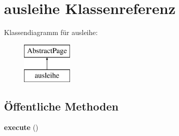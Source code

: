 \hypertarget{classausleihe}{}\section{ausleihe Klassenreferenz}
\label{classausleihe}
Klassendiagramm für ausleihe\+:\begin{figure}[H]
\begin{center}
\leavevmode
\includegraphics[height=2.000000cm]{classausleihe}
\end{center}
\end{figure}
\subsection*{Öffentliche Methoden}
\begin{DoxyCompactItemize}
\item 
\mbox{\label{classausleihe_aff825fde10b6172f4b1f729e4973b4b2}} 
{\bfseries execute} ()
\end{DoxyCompactItemize}
